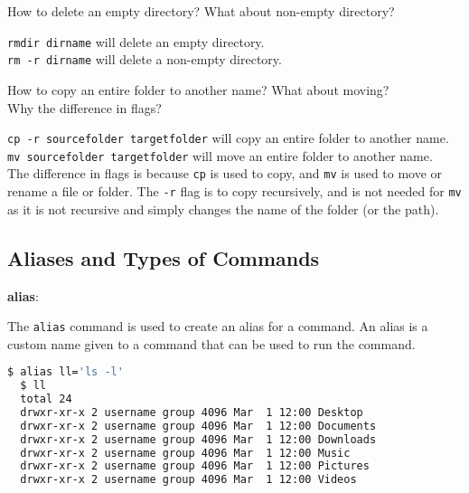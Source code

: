 \begin{qs}
  How to delete an empty directory? What about non-empty directory?
\end{qs}

\begin{ans}
  \lstinline|rmdir dirname| will delete an empty directory. \\
  \lstinline|rm -r dirname| will delete a non-empty directory.
\end{ans}

\begin{qs}
  How to copy an entire folder to another name? What about moving? \\
  Why the difference in flags?
\end{qs}

\begin{ans}
  \lstinline|cp -r sourcefolder targetfolder| will copy an entire folder to another name. \\
  \lstinline|mv sourcefolder targetfolder| will move an entire folder to another name. \\
  The difference in flags is because \lstinline|cp| is used to copy, and \lstinline|mv| is used to move or rename a file or folder.
  The \lstinline|-r| flag is to copy recursively, and is not needed for \lstinline|mv| as it is not recursive
  and simply changes the name of the folder (or the path).
\end{ans}

\subsection{Aliases and Types of Commands}

\textbf{alias}:

The \lstinline|alias| command is used to create an alias for a command.
An alias is a custom name given to a command that can be used to run the command.

\begin{lstlisting}[language=bash]
  $ alias ll='ls -l'
  $ ll
  total 24
  drwxr-xr-x 2 username group 4096 Mar  1 12:00 Desktop
  drwxr-xr-x 2 username group 4096 Mar  1 12:00 Documents
  drwxr-xr-x 2 username group 4096 Mar  1 12:00 Downloads
  drwxr-xr-x 2 username group 4096 Mar  1 12:00 Music
  drwxr-xr-x 2 username group 4096 Mar  1 12:00 Pictures
  drwxr-xr-x 2 username group 4096 Mar  1 12:00 Videos
\end{lstlisting}


